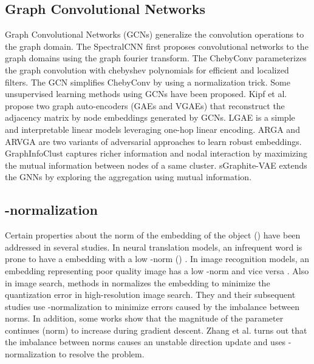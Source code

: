 \documentclass[sigconf]{acmart}
\begin{document}
\subsection{Graph Convolutional Networks}
Graph Convolutional Networks (GCNs) generalize the convolution operations to the graph domain.
The SpectralCNN \cite{bruna2013spectral} first proposes convolutional networks to the graph domains using the graph fourier transform.
The ChebyConv \cite{defferrard2016convolutional} parameterizes the graph convolution with chebyshev polynomials for efficient and localized filters.
The GCN \cite{kipf2016semi} simplifies ChebyConv by using a normalization trick.
Some unsupervised learning methods using GCNs have been proposed.
Kipf et al. \cite{kipf2016variational} propose two graph auto-encoders (GAEs and VGAEs) that reconstruct the adjacency matrix by node embeddings generated by GCNs.
LGAE \cite{salha2020simple} is a simple and interpretable linear models leveraging one-hop linear encoding.
ARGA and ARVGA \cite{pan2018adversarially} are two variants of adversarial approaches to learn robust embeddings.
GraphInfoClust \cite{mavromatis2020graph} captures richer information and nodal interaction by maximizing the mutual information between nodes of a same cluster.
sGraphite-VAE \cite{di2020mutual} extends the GNNs by exploring the aggregation using mutual information.



\subsection{-normalization}
Certain properties about the norm of the embedding of the object () have been addressed in several studies.
In neural translation models, an infrequent word is prone to have a embedding with a low -norm () \cite{kobayashi2020attention, arefyev2018much, schakel2015measuring, nguyen2017improving, nguyen2019transformers}.
In image recognition models, an embedding representing poor quality image has a low -norm and vice versa \cite{liu2017sphereface,wang2018cosface}.
Also in image search, methods in \cite{wu2017multiscale, eghbali2019deep} normalizes the embedding to minimize the quantization error in high-resolution image search.
They and their subsequent studies use -normalization \cite{ranjan2017l2,wang2017normface,zheng2018ring} to minimize errors caused by the imbalance between norms.
In addition, some works \cite{merrill2020parameter,nguyen2019transformers} show that the magnitude of the parameter continues (norm) to increase during gradient descent.
Zhang et al. \cite{zhang2020deep} turns out that the imbalance between norms causes an unstable direction update and uses -normalization to resolve the problem.
\end{document}
